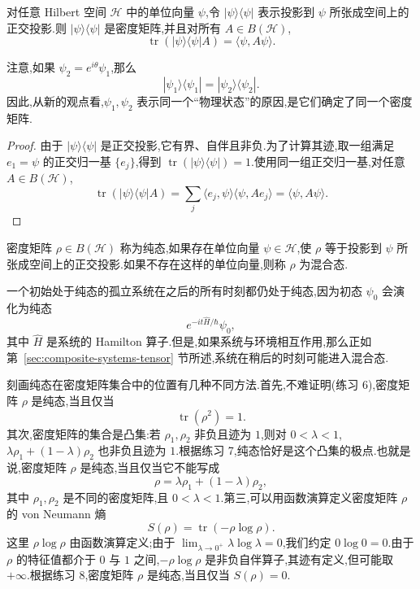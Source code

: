 \begin{proposition}[单位向量与纯态]\label{prop:unit-vector-pure-state}
对任意 Hilbert 空间 $\mathcal H$ 中的单位向量 $\psi$,令 $|\psi\rangle\langle\psi|$ 表示投影到 $\psi$ 所张成空间上的正交投影.则 $|\psi\rangle\langle\psi|$ 是密度矩阵,并且对所有 $A\in B(\mathcal H)$,
\[
 \operatorname{tr}(|\psi\rangle\langle\psi|A)
 =\langle\psi,A\psi\rangle.
\]
\end{proposition}

注意,如果 $\psi_2=e^{i\theta}\psi_1$,那么
\[
 |\psi_1\rangle\langle\psi_1|
 =|\psi_2\rangle\langle\psi_2|.
\]
因此,从新的观点看,$\psi_1,\psi_2$ 表示同一个“物理状态”的原因,是它们确定了同一个密度矩阵.

\begin{proof}
由于 $|\psi\rangle\langle\psi|$ 是正交投影,它有界、自伴且非负.为了计算其迹,取一组满足 $e_1=\psi$ 的正交归一基 $\{e_j\}$,得到 $\operatorname{tr}(|\psi\rangle\langle\psi|)=1$.使用同一组正交归一基,对任意 $A\in B(\mathcal H)$,
\[
 \operatorname{tr}(|\psi\rangle\langle\psi|A)
 =\sum_j\langle e_j,\psi\rangle\langle\psi,Ae_j\rangle
 =\langle\psi,A\psi\rangle.
\]
\end{proof}

\begin{definition}[纯态与混合态]\label{def:pure-mixed-state}
密度矩阵 $\rho\in B(\mathcal H)$ 称为纯态,如果存在单位向量 $\psi\in\mathcal H$,使 $\rho$ 等于投影到 $\psi$ 所张成空间上的正交投影.如果不存在这样的单位向量,则称 $\rho$ 为混合态.
\end{definition}

一个初始处于纯态的孤立系统在之后的所有时刻都仍处于纯态,因为初态 $\psi_0$ 会演化为纯态
\[
 e^{-it\widehat H/\hbar}\psi_0,
\]
其中 $\widehat H$ 是系统的 Hamilton 算子.但是,如果系统与环境相互作用,那么正如第~\ref{sec:composite-systems-tensor} 节所述,系统在稍后的时刻可能进入混合态.

刻画纯态在密度矩阵集合中的位置有几种不同方法.首先,不难证明(练习 6),密度矩阵 $\rho$ 是纯态,当且仅当
\[
 \operatorname{tr}(\rho^2)=1.
\]
其次,密度矩阵的集合是凸集:若 $\rho_1,\rho_2$ 非负且迹为 $1$,则对 $0<\lambda<1$,$\lambda\rho_1+(1-\lambda)\rho_2$ 也非负且迹为 $1$.根据练习 7,纯态恰好是这个凸集的极点.也就是说,密度矩阵 $\rho$ 是纯态,当且仅当它不能写成
\[
 \rho=\lambda\rho_1+(1-\lambda)\rho_2,
\]
其中 $\rho_1,\rho_2$ 是不同的密度矩阵,且 $0<\lambda<1$.第三,可以用函数演算定义密度矩阵 $\rho$ 的 von Neumann 熵
\[
 S(\rho)=\operatorname{tr}(-\rho\log\rho).
\]
这里 $\rho\log\rho$ 由函数演算定义;由于 $\lim_{\lambda\to0^+}\lambda\log\lambda=0$,我们约定 $0\log0=0$.由于 $\rho$ 的特征值都介于 $0$ 与 $1$ 之间,$-\rho\log\rho$ 是非负自伴算子,其迹有定义,但可能取 $+\infty$.根据练习 8,密度矩阵 $\rho$ 是纯态,当且仅当 $S(\rho)=0$.

